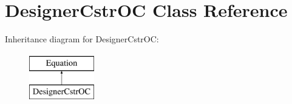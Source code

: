 \hypertarget{class_open_chams_1_1_designer_cstr_o_c}{\section{Designer\-Cstr\-O\-C Class Reference}
\label{class_open_chams_1_1_designer_cstr_o_c}
}
Inheritance diagram for Designer\-Cstr\-O\-C\-:\begin{figure}[H]
\begin{center}
\leavevmode
\includegraphics[height=2.000000cm]{class_open_chams_1_1_designer_cstr_o_c}
\end{center}
\end{figure}
